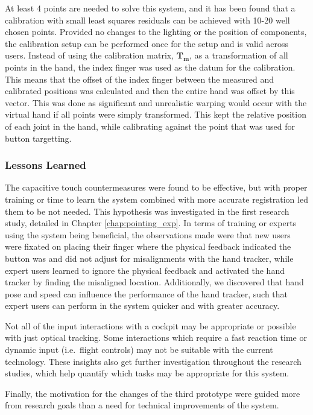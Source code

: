 At least 4 points are needed to solve this system, and it has been found that a calibration with small least squares residuals can be achieved with 10-20 well chosen points.
Provided no changes to the lighting or the position of components, the calibration setup can be performed once for the setup and is valid across users.
Instead of using the calibration matrix, $\mathbf{T_m}$, as a transformation of all points in the hand, the index finger was used as the datum for the calibration.
This means that the offset of the index finger between the measured and calibrated positions was calculated and then the entire hand was offset by this vector.
This was done as significant and unrealistic warping would occur with the virtual hand if all points were simply transformed.
This kept the relative position of each joint in the hand, while calibrating against the point that was used for button targetting.

\subsubsection{Lessons Learned}

The capacitive touch countermeasures were found to be effective, but with proper training or time to learn the system combined with more accurate registration led them to be not needed.
This hypothesis was investigated in the first research study, detailed in Chapter \ref{chap:pointing_exp}.
In terms of training or experts using the system being beneficial, the observations made were that new users were fixated on placing their finger where the physical feedback indicated the button was and did not adjust for misalignments with the hand tracker, while expert users learned to ignore the physical feedback and activated the hand tracker by finding the misaligned location.
Additionally, we discovered that hand pose and speed can influence the performance of the hand tracker, such that expert users can perform in the system quicker and with greater accuracy.

Not all of the input interactions with a cockpit may be appropriate or possible with just optical tracking.
Some interactions which require a fast reaction time or dynamic input (i.e.\ flight controls) may not be suitable with the current technology.
These insights also get further investigation throughout the research studies, which help quantify which tasks may be appropriate for this system.

Finally, the motivation for the changes of the third prototype were guided more from research goals than a need for technical improvements of the system.

